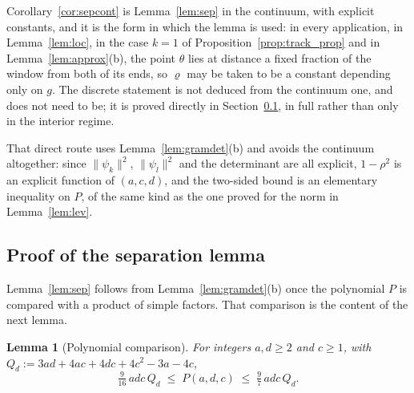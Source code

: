 \documentclass[12pt, a4paper]{article}
\newtheorem{lemma}{Lemma}[section]
\begin{document}
Corollary~\ref{cor:sepcont} is Lemma~\ref{lem:sep} in the continuum, with
explicit constants, and it is the form in which the lemma is used: in every
application, in Lemma~\ref{lem:loc}, in the case $k=1$ of
Proposition~\ref{prop:track_prop} and in Lemma~\ref{lem:approx}(b), the point
$\theta$ lies at distance a fixed fraction of the window from both of its ends,
so $\varrho$ may be taken to be a constant depending only on $g$. The discrete statement is not deduced from the continuum one, and does not need to be; it is proved directly in Section~\ref{sup:sepproof}, in full rather than only in the interior regime.

That direct route uses Lemma~\ref{lem:gramdet}(b) and avoids the continuum altogether: since $\|\psi_k\|^2$, $\|\psi_l\|^2$ and the determinant are all explicit, $1-\rho^2$ is an explicit function of $(a,c,d)$, and the two-sided bound is an elementary inequality on $P$, of the same kind as the one proved for the norm in Lemma~\ref{lem:lev}.


\subsection{Proof of the separation lemma}
\label{sup:sepproof}

Lemma~\ref{lem:sep} follows from Lemma~\ref{lem:gramdet}(b) once the polynomial
$P$ is compared with a product of simple factors. That comparison is the
content of the next lemma.

\begin{lemma}[Polynomial comparison]
\label{lem:polycomp}
For integers $a, d \ge 2$ and $c \ge 1$, with
$Q_d := 3ad + 4ac + 4dc + 4c^2 - 3a - 4c$,
\[
\tfrac{9}{16}\, a d c\, Q_d \;\le\; P(a,d,c) \;\le\; \tfrac97\, a d c\, Q_d .
\]
\end{lemma}
\end{document}
